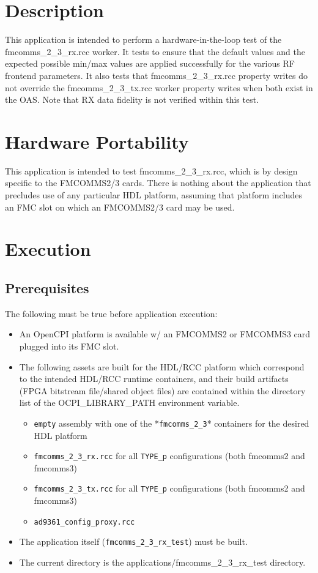 \tableofcontents
\newpage

\section{Description}
This application is intended to perform a hardware-in-the-loop test of the fmcomms\_2\_3\_rx.rcc worker. It tests to ensure that the default values and the expected possible min/max values are applied successfully for the various RF frontend parameters. It also tests that fmcomms\_2\_3\_rx.rcc property writes do not override the fmcomms\_2\_3\_tx.rcc worker property writes when both exist in the OAS. Note that RX data fidelity is not verified within this test.

\section{Hardware Portability}
This application is intended to test fmcomms\_2\_3\_rx.rcc, which is by design specific to the FMCOMMS2/3 cards. There is nothing about the application that precludes use of any particular HDL platform, assuming that platform includes an FMC slot on which an FMCOMMS2/3 card may be used.

\section{Execution}
\subsection{Prerequisites}
The following must be true before application execution:
\begin{itemize}
  \item An OpenCPI platform is available w/ an FMCOMMS2 or FMCOMMS3 card plugged into its FMC slot.
  \item The following assets are built for the HDL/RCC platform which correspond to the intended HDL/RCC runtime containers, and their build artifacts (FPGA bitstream file/shared object files) are contained within the directory list of the OCPI\_LIBRARY\_PATH environment variable.
  \begin{itemize}
    \item \verb+empty+ assembly with one of the *\verb+fmcomms_2_3+* containers for the desired HDL platform
    \item \verb+fmcomms_2_3_rx.rcc+ for all \verb+TYPE_p+ configurations (both fmcomms2 and fmcomms3)
    \item \verb+fmcomms_2_3_tx.rcc+ for all \verb+TYPE_p+ configurations (both fmcomms2 and fmcomms3)
    \item \verb+ad9361_config_proxy.rcc+
  \end{itemize}
  \item The application itself (\verb+fmcomms_2_3_rx_test+) must be built.
  \item The current directory is the applications/fmcomms\_2\_3\_rx\_test directory.
\end{itemize}

